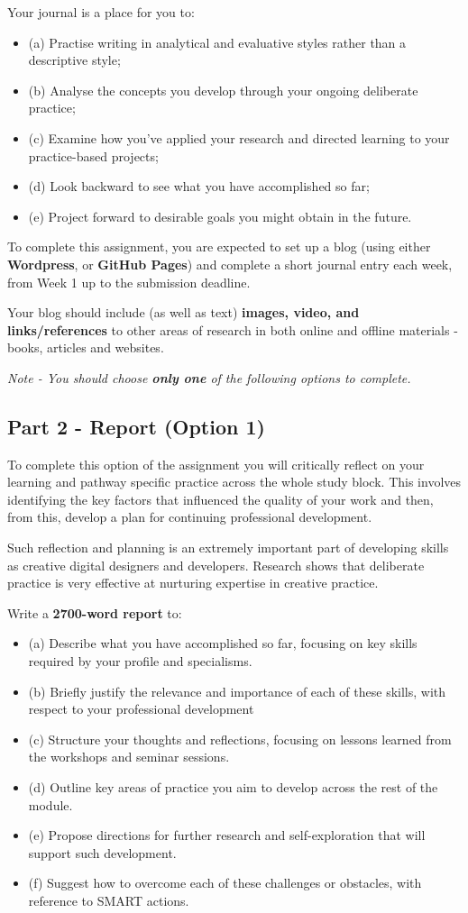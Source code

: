 \documentclass{../../fal_assignment}
\begin{document}
Your journal is a place for you to:
\begin{itemize}
	\item (a) Practise writing in analytical and evaluative styles rather than a descriptive style;
	\item (b) Analyse the concepts you develop through your ongoing deliberate practice;
	\item (c) Examine how you’ve applied your research and directed learning to your practice-based projects;
	\item (d) Look backward to see what you have accomplished so far;
	\item (e) Project forward to desirable goals you might obtain in the future.
\end{itemize}

To complete this assignment, you are expected to set up a blog (using either \textbf{Wordpress}, or \textbf{GitHub Pages}) and complete a short journal entry each week, from Week 1 up to the submission deadline.

Your blog should include (as well as text) \textbf{images, video, and links/references} to other areas of research in both online and offline materials - books, articles and websites.

\emph{Note - You should choose \textbf{only one} of the following options to complete.}
	
\subsection*{Part 2 - Report (Option 1)} 

To complete this option of the assignment you will critically reflect on your learning and pathway specific practice across the whole study block. This involves identifying the key factors that influenced the quality of your work and then, from this, develop a plan for continuing professional development.

Such reflection and planning is an extremely important part of developing skills as creative digital designers and developers. Research shows that deliberate practice is very effective at nurturing expertise in creative practice.

Write a \textbf{2700-word report} to:
\begin{itemize}
\item(a) Describe what you have accomplished so far, focusing on key skills required by your profile and specialisms.
\item (b) Briefly justify the relevance and importance of each of these skills, with respect to your professional development
\item(c) Structure your thoughts and reflections, focusing on lessons learned from the workshops and seminar sessions.
\item(d) Outline key areas of practice you aim to develop across the rest of the module.
\item(e) Propose directions for further research and self-exploration that will support such development.
\item (f) Suggest how to overcome each of these challenges or obstacles, with reference to SMART actions.
\end{itemize}
\end{document}
